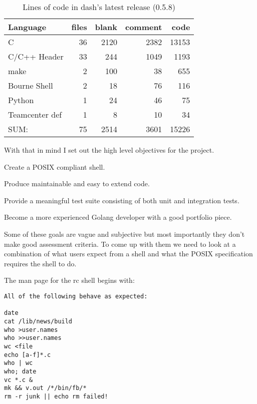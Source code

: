\begin{table}[p]
\centering
\caption{Lines of code in dash's latest release (0.5.8)}
\label{tab:dash-loc}
\begin{tabular}{@{}lrrrr@{}}
\toprule
Language       & files & blank & comment & code  \\ \midrule
C              & 36    & 2120  & 2382    & 13153 \\
C/C++ Header   & 33    & 244   & 1049    & 1193  \\
make           & 2     & 100   & 38      & 655   \\
Bourne Shell   & 2     & 18    & 76      & 116   \\
Python         & 1     & 24    & 46      & 75    \\
Teamcenter def & 1     & 8     & 10      & 34    \\ \midrule
SUM:           & 75    & 2514  & 3601    & 15226 \\ \bottomrule
\end{tabular}
\end{table}

With that in mind I set out the high level objectives for the project.

\begin{itemize*}
    \item Create a POSIX\cite{POSIX-SHELL-STANDARD} compliant shell.
    \item Produce maintainable and easy to extend code.
    \item Provide a meaningful test suite consisting of both unit and integration tests.
    \item Become a more experienced Golang developer with a good portfolio piece.
\end{itemize*}

Some of these goals are vague and subjective but most importantly they don't make good assessment criteria.
To come up with them we need to look at a combination of what users expect from a shell and what the POSIX specification requires the shell to do.

The man page for the rc shell begins with:
\begin{lstlisting}
All of the following behave as expected:

date
cat /lib/news/build
who >user.names
who >>user.names
wc <file
echo [a-f]*.c
who | wc
who; date
vc *.c &
mk && v.out /*/bin/fb/*
rm -r junk || echo rm failed!
\end{lstlisting}

